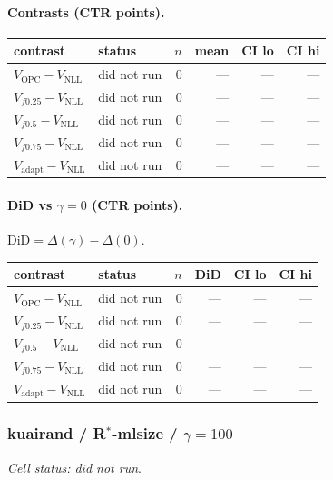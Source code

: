 \documentclass[10pt,a4paper]{article}
\begin{document}
\paragraph{Contrasts (CTR points).}
{\centering\small\begin{tabular}{llrrrr}
\toprule contrast & status & $n$ & mean & CI lo & CI hi \\
\midrule
$V_{\mathrm{OPC}}-V_{\mathrm{NLL}}$ & did not run & 0 & --- & --- & --- \\
$V_{f0.25}-V_{\mathrm{NLL}}$ & did not run & 0 & --- & --- & --- \\
$V_{f0.5}-V_{\mathrm{NLL}}$ & did not run & 0 & --- & --- & --- \\
$V_{f0.75}-V_{\mathrm{NLL}}$ & did not run & 0 & --- & --- & --- \\
$V_{\mathrm{adapt}}-V_{\mathrm{NLL}}$ & did not run & 0 & --- & --- & --- \\
\bottomrule\end{tabular}\par}
\paragraph{DiD vs $\gamma=0$ (CTR points).} $\mathrm{DiD}=\Delta(\gamma)-\Delta(0)$.
{\centering\small\begin{tabular}{llrrrr}
\toprule contrast & status & $n$ & DiD & CI lo & CI hi \\
\midrule
$V_{\mathrm{OPC}}-V_{\mathrm{NLL}}$ & did not run & 0 & --- & --- & --- \\
$V_{f0.25}-V_{\mathrm{NLL}}$ & did not run & 0 & --- & --- & --- \\
$V_{f0.5}-V_{\mathrm{NLL}}$ & did not run & 0 & --- & --- & --- \\
$V_{f0.75}-V_{\mathrm{NLL}}$ & did not run & 0 & --- & --- & --- \\
$V_{\mathrm{adapt}}-V_{\mathrm{NLL}}$ & did not run & 0 & --- & --- & --- \\
\bottomrule\end{tabular}\par}
\bigskip
\subsubsection{kuairand / R$^*$-mlsize / $\gamma=100$}
\emph{Cell status: did not run}.
\end{document}
